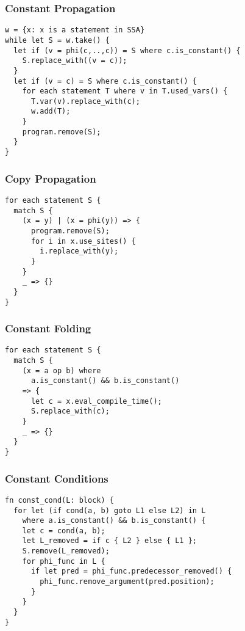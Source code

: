 \documentclass[8pt]{extarticle}
\begin{document}
\begin{multicols*}{2}
  \subsubsection{Constant Propagation}

\begin{verbatim}
w = {x: x is a statement in SSA}
while let S = w.take() {
  let if (v = phi(c,..,c)) = S where c.is_constant() {
    S.replace_with((v = c));
  }
  let if (v = c) = S where c.is_constant() {
    for each statement T where v in T.used_vars() {
      T.var(v).replace_with(c);
      w.add(T);
    }
    program.remove(S);
  }
}
\end{verbatim}

  \subsubsection{Copy Propagation}

\begin{verbatim}
for each statement S {
  match S {
    (x = y) | (x = phi(y)) => {
      program.remove(S);
      for i in x.use_sites() {
        i.replace_with(y);
      }
    }
    _ => {}
  }
}
\end{verbatim}

  \subsubsection{Constant Folding}

\begin{verbatim}
for each statement S {
  match S {
    (x = a op b) where
      a.is_constant() && b.is_constant()
    => {
      let c = x.eval_compile_time();
      S.replace_with(c);
    }
    _ => {}
  }
}
\end{verbatim}
  
  \subsubsection{Constant Conditions}

\begin{verbatim}
fn const_cond(L: block) {
  for let (if cond(a, b) goto L1 else L2) in L
    where a.is_constant() && b.is_constant() {
    let c = cond(a, b);
    let L_removed = if c { L2 } else { L1 };
    S.remove(L_removed);
    for phi_func in L {
      if let pred = phi_func.predecessor_removed() {
        phi_func.remove_argument(pred.position);
      }
    }
  }
}
\end{verbatim}


\end{multicols*}
\end{document}
